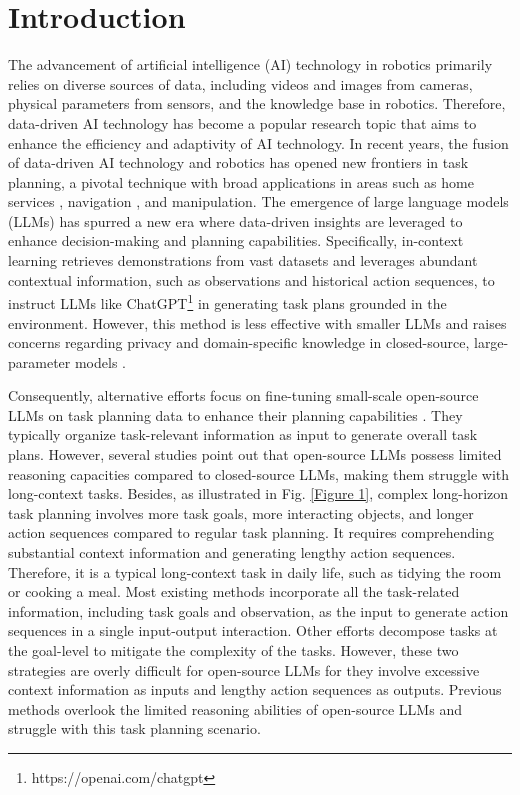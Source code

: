 \section{Introduction}
The advancement of artificial intelligence (AI) technology in robotics primarily relies on diverse sources of data, including videos and images from cameras, physical parameters from sensors, and the knowledge base in robotics. Therefore, data-driven AI technology has become a popular research topic that aims to enhance the efficiency and adaptivity of AI technology. In recent years, the fusion of data-driven AI technology and robotics has opened new frontiers in task planning, a pivotal technique with broad applications in areas such as home services \cite{DBLP:conf/corl/IchterBCFHHHIIJ22,DBLP:journals/ral/FioriniSPBTC22}, navigation  \cite{DBLP:conf/icra/HuangMZB23}, and manipulation\cite{DBLP:conf/corl/GuhurCPTLS22}. The emergence of large language models (LLMs) has spurred a new era where data-driven insights are leveraged to enhance decision-making and planning capabilities. Specifically, in-context learning \cite{radford2019language,DBLP:conf/nips/BrownMRSKDNSSAA20} retrieves demonstrations from vast datasets and leverages abundant contextual information, such as observations and historical action sequences, to instruct LLMs like ChatGPT\footnote{https://openai.com/chatgpt} in generating task plans grounded in the environment. However, this method is less effective with smaller LLMs \cite{DBLP:journals/corr/abs-2310-12823,DBLP:conf/nips/LiuTMMHBR22} and raises concerns regarding privacy and domain-specific knowledge in closed-source, large-parameter models \cite{wu2023unveiling,ray2023chatgpt}.

Consequently, alternative efforts focus on fine-tuning small-scale open-source LLMs on task planning data to enhance their planning capabilities \cite{DBLP:journals/corr/abs-2305-10626,DBLP:journals/corr/abs-2307-01848,chalvatzaki2023learning}. They typically organize task-relevant information as input to generate overall task plans. However, several studies \cite{DBLP:journals/corr/abs-2308-03688,DBLP:journals/corr/abs-2307-11088} point out that open-source LLMs possess limited reasoning capacities compared to closed-source LLMs, making them struggle with long-context tasks. Besides, as illustrated in Fig. \ref{Figure 1}, complex long-horizon task planning involves more task goals, more interacting objects, and longer action sequences compared to regular task planning. It requires comprehending substantial context information and generating lengthy action sequences. Therefore, it is a typical long-context task in daily life, such as tidying the room or cooking a meal. Most existing methods incorporate all the task-related information, including task goals and observation, as the input to generate action sequences in a single input-output interaction. Other efforts decompose tasks at the goal-level to mitigate the complexity of the tasks. However, these two strategies are overly difficult for open-source LLMs for they involve excessive context information as inputs and lengthy action sequences as outputs. Previous methods overlook the limited reasoning abilities of open-source LLMs and struggle with this task planning scenario. 

